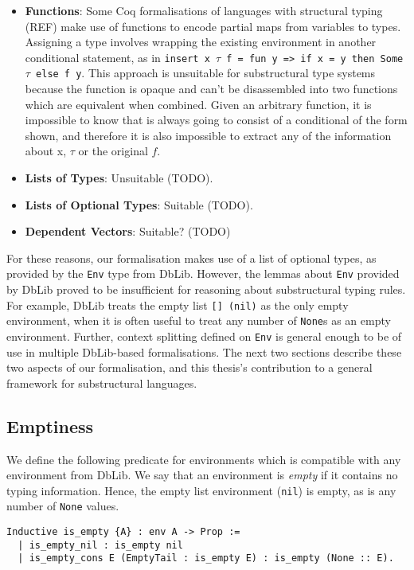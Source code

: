 \documentclass[]{unswthesis}
\let\c\texttt
\let\i\textit
\begin{document}
\begin{itemize}
\item \textbf{Functions}: Some Coq formalisations of languages with structural typing (REF) make use of functions to encode partial maps from variables to types. Assigning a type involves wrapping the existing environment in another conditional statement, as in \c{insert x $\tau$ f = fun y => if x = y then Some $\tau$ else f y}. This approach is unsuitable for substructural type systems because the function is opaque and can't be disassembled into two functions which are equivalent when combined. Given an arbitrary function, it is impossible to know that is always going to consist of a conditional of the form shown, and therefore it is also impossible to extract any of the information about x, $\tau$ or the original $f$.
\item \textbf{Lists of Types}: Unsuitable (TODO).
\item \textbf{Lists of Optional Types}: Suitable (TODO).
\item \textbf{Dependent Vectors}: Suitable? (TODO)
\end{itemize} 

For these reasons, our formalisation makes use of a list of optional types, as provided by the \c{Env} type from DbLib. However, the lemmas about \c{Env} provided by DbLib proved to be insufficient for reasoning about substructural typing rules. For example, DbLib treats the empty list \c{[] (nil)} as the only empty environment, when it is often useful to treat any number of \c{None}s as an empty environment. Further, context splitting defined on \c{Env} is general enough to be of use in multiple DbLib-based formalisations. The next two sections describe these two aspects of our formalisation, and this thesis's contribution to a general framework for substructural languages.

\subsection{Emptiness}

We define the following predicate for environments which is compatible with any environment from DbLib. We say that an environment is \i{empty} if it contains no typing information. Hence, the empty list environment (\c{nil}) is empty, as is any number of \c{None} values.

\begin{verbatim}
Inductive is_empty {A} : env A -> Prop :=
  | is_empty_nil : is_empty nil
  | is_empty_cons E (EmptyTail : is_empty E) : is_empty (None :: E).
\end{verbatim}
\end{document}
